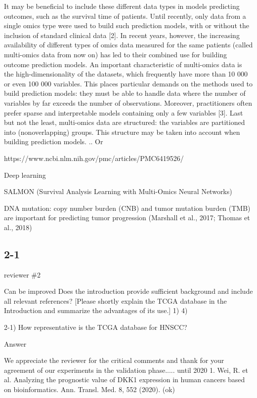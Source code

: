 \documentclass[preprint,12pt]{elsarticle}
\newenvironment{MyColorPar}[1]{%
    \leavevmode\color{#1}\ignorespaces%
}{%
}%
\begin{document}
\begin{MyColorPar}{blue}
It may be beneficial to include these different data types in models predicting outcomes, such as the survival time of patients. Until recently, only data from a single omics type were used to build such prediction models, with or without the inclusion of standard clinical data [2]. In recent years, however, the increasing availability of different types of omics data measured for the same patients (called multi-omics data from now on) has led to their combined use for building outcome prediction models. An important characteristic of multi-omics data is the high-dimensionality of the datasets, which frequently have more than 10 000 or even 100 000 variables. This places particular demands on the methods used to build prediction models: they must be able to handle data where the number of variables by far exceeds the number of observations. Moreover, practitioners often prefer sparse and interpretable models containing only a few variables [3]. Last but not the least, multi-omics data are structured: the variables are partitioned into (nonoverlapping) groups. This structure may be taken into account when building prediction models.
..
Or

https://www.ncbi.nlm.nih.gov/pmc/articles/PMC6419526/

Deep learning

SALMON (Survival Analysis Learning with Multi-Omics Neural Networks)

DNA mutation:
copy number burden (CNB) and tumor mutation burden (TMB) are important for predicting tumor progression (Marshall et al., 2017; Thomas et al., 2018)
\end{MyColorPar}

\subsection*{2-1}
reviewer \#2

Can be improved
Does the introduction provide sufficient background and include all relevant references? [Please shortly explain the TCGA database in the Introduction and summarize the advantages of its use.] 1) 4)

2-1) How representative is the TCGA database for HNSCC?

\begin{MyColorPar}{blue}
Answer

We appreciate the reviewer for the critical comments and thank for your agreement of our experiments in the validation phase.....
\cite{Lawrence2015a}
until 2020 1. Wei, R. et al. Analyzing the prognostic value of DKK1 expression in human cancers based on bioinformatics. Ann. Transl. Med. 8, 552 (2020).
\cite{Tang2019}\cite{Wei2020a}
(ok)
\end{MyColorPar}
\end{document}
